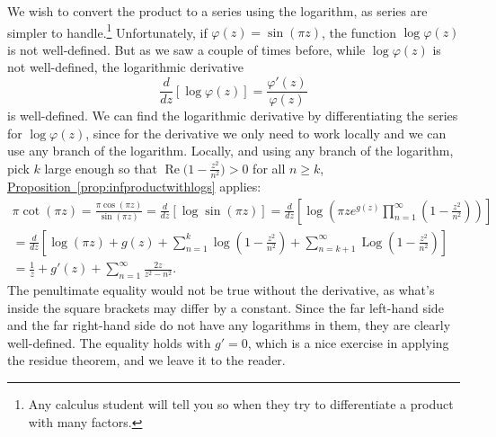 \documentclass[12pt,openany]{book}
\renewcommand{\Re}{\operatorname{Re}}
\newcommand{\Log}{\operatorname{Log}}
\theoremstyle{plain}
\theoremstyle{remark}
\theoremstyle{definition}
\theoremstyle{exercise}
\theoremstyle{example}
\newcommand{\propref}[1]{\hyperref[#1]{Proposition~\ref*{#1}}}
\begin{document}
We wish to convert the product to a series using the
logarithm, as series are simpler to handle.\footnote{Any calculus student
will tell you so when they try to differentiate a product with many
factors.}  Unfortunately, if $\varphi(z) =
\sin(\pi z)$, the function
$\log \varphi(z)$ is not well-defined.
But as we saw a couple of times before, while $\log \varphi(z)$ is not
well-defined, the logarithmic derivative
\begin{equation*}
\frac{d}{dz} \left[
\log \varphi(z)
\right]
=
\frac{\varphi'(z)}{\varphi(z)}
\end{equation*}
is well-defined.  We can find the logarithmic derivative by differentiating
the series for $\log \varphi(z)$,
since for the derivative we only need to work locally and we can use
any branch of the logarithm.
Locally, and using any branch of the logarithm,
pick $k$ large enough so that $\Re \bigl( 1-\frac{z^2}{n^2} \bigr) > 0$
for all $n \geq k$,
\propref{prop:infproductwithlogs} applies:
\begin{multline*}
\pi \cot (\pi z) =
\frac{\pi \cos (\pi z)}{\sin(\pi z)}
=
\frac{d}{dz} \left[
\log \sin (\pi z)
\right]
=
\frac{d}{dz} \left[
\log 
\left(
\pi z
e^{g(z)}
\prod_{n=1}^\infty 
\left(1-\frac{z^2}{n^2}\right)
\right)
\right]
\\
=
\frac{d}{dz} \left[
\log(\pi z)
+
g(z)
+
\sum_{n=1}^k 
\log
\left(1-\frac{z^2}{n^2}\right)
+
\sum_{n=k+1}^\infty
\Log
\left(1-\frac{z^2}{n^2}\right)
\right]
\\
=
\frac{1}{z}
+
g'(z)
+
\sum_{n=1}^\infty 
\frac{2z}{z^2-n^2} .
\end{multline*}
The penultimate equality would not be true without the derivative, as what's
inside the square brackets may differ by a constant.
Since the far left-hand side and the far right-hand side do not have any
logarithms in them, they are clearly well-defined.
The equality holds with $g'=0$, which is 
a nice exercise in applying the residue theorem, and we
leave it to the reader.
\end{document}
